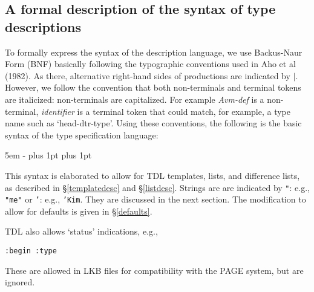 \documentclass[12pt]{report}
\begin{document}
\subsection{A formal description of the syntax of type descriptions}
\label{bnftype}

To formally express the syntax of the description language, we
use Backus-Naur Form (BNF) basically following the typographic conventions used
in Aho et al (1982).
As there, alternative right-hand sides of productions are indicated by
$|$.  
However, we follow the convention that both non-terminals and
terminal tokens are italicized: non-terminals are capitalized.
For example {\it Avm-def} is a non-terminal, {\it identifier}
is a terminal token that could match, for example, a type name
such as `head-dtr-type'.
Using these conventions, the following is the basic
syntax of the type specification 
language:
\begin{list}{}
   {\leftmargin 5em
    \itemindent -\leftmargin
    \itemsep 0pt plus 1pt
    \parsep 0pt plus 1pt}
\end{list}
This syntax is elaborated to allow for 
TDL templates, lists, and difference lists,
as described in \S\ref{templatedesc} and \S\ref{listdesc}.  Strings are 
are indicated by
{\tt "}: e.g., {\tt "me"} or {\tt '}: e.g.,  {\tt 'Kim}.  They are
discussed in the next section.  The modification to allow
for defaults is given in \S\ref{defaults}.

TDL also allows `status' indications, e.g.,
\begin{verbatim}
:begin :type
\end{verbatim}
These are allowed in LKB files for compatibility with the PAGE
system, but are ignored.  
\end{document}
